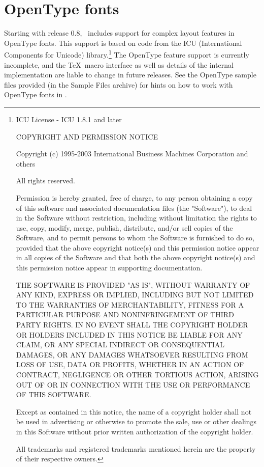 \section{OpenType fonts}

Starting with release 0.8, \XeTeX\ includes  support for complex layout features in OpenType fonts. This support is based on code from the ICU (International Components for Unicode) library.\footnote{ICU License - ICU 1.8.1 and later

COPYRIGHT AND PERMISSION NOTICE

Copyright (c) 1995-2003 International Business Machines Corporation and others

All rights reserved.

Permission is hereby granted, free of charge, to any person obtaining a
copy of this software and associated documentation files (the
"Software"), to deal in the Software without restriction, including
without limitation the rights to use, copy, modify, merge, publish,
distribute, and/or sell copies of the Software, and to permit persons
to whom the Software is furnished to do so, provided that the above
copyright notice(s) and this permission notice appear in all copies of
the Software and that both the above copyright notice(s) and this
permission notice appear in supporting documentation.

THE SOFTWARE IS PROVIDED "AS IS", WITHOUT WARRANTY OF ANY KIND, EXPRESS
OR IMPLIED, INCLUDING BUT NOT LIMITED TO THE WARRANTIES OF
MERCHANTABILITY, FITNESS FOR A PARTICULAR PURPOSE AND NONINFRINGEMENT
OF THIRD PARTY RIGHTS. IN NO EVENT SHALL THE COPYRIGHT HOLDER OR
HOLDERS INCLUDED IN THIS NOTICE BE LIABLE FOR ANY CLAIM, OR ANY SPECIAL
INDIRECT OR CONSEQUENTIAL DAMAGES, OR ANY DAMAGES WHATSOEVER RESULTING
FROM LOSS OF USE, DATA OR PROFITS, WHETHER IN AN ACTION OF CONTRACT,
NEGLIGENCE OR OTHER TORTIOUS ACTION, ARISING OUT OF OR IN CONNECTION
WITH THE USE OR PERFORMANCE OF THIS SOFTWARE.

Except as contained in this notice, the name of a copyright holder
shall not be used in advertising or otherwise to promote the sale, use
or other dealings in this Software without prior written authorization
of the copyright holder.

All trademarks and registered trademarks mentioned herein are the property of their respective owners.}
The OpenType feature support is currently incomplete, and the \TeX\ macro interface as well as details of the internal implementation are liable to change in future releases. See the OpenType sample files provided (in the Sample Files archive) for hints on how to work with OpenType fonts in \XeTeX.



